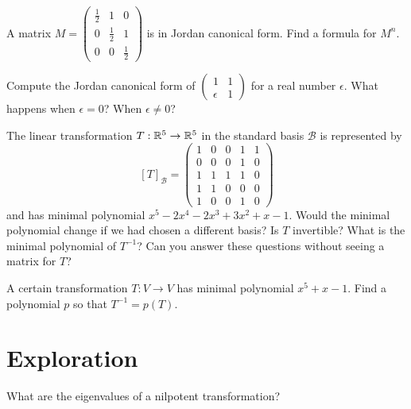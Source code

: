 \documentclass{homework}
\begin{document}
\begin{problem}
  A matrix $M = \left(\begin{array}{rrr}
\frac{1}{2} & 1 & 0 \\
0 & \frac{1}{2} & 1 \\
0 & 0 & \frac{1}{2}
\end{array}\right)$ is in Jordan canonical form.  Find a formula for $M^n$.
\end{problem}

\begin{problem}
  Compute the Jordan canonical form of
  $\begin{pmatrix} 1 & 1 \\ \epsilon & 1 \end{pmatrix}$ for a real number $\epsilon$.  What happens when $\epsilon = 0$?  When $\epsilon \neq 0$?
\end{problem}

\begin{problem}
  The linear transformation $T : \mathbb{R}^5 \to \mathbb{R}^5$ in the standard basis $\mathcal{B}$ is represented by
  \[
    [T]_{\mathcal{B}} = \left(\begin{array}{rrrrr}
            1 & 0 & 0 & 1 & 1 \\
            0 & 0 & 0 & 1 & 0 \\
            1 & 1 & 1 & 1 & 0 \\
            1 & 1 & 0 & 0 & 0 \\
            1 & 0 & 0 & 1 & 0
          \end{array}\right)
      \]
      and has minimal polynomial $x^{5} - 2x^{4} - 2x^{3} + 3x^{2} + x - 1$.  Would the minimal polynomial change if we had chosen a different basis?  Is $T$ invertible?  What is the minimal polynomial of $T^{-1}$?  Can you answer these questions without seeing a matrix for $T$?
\end{problem}

\begin{problem}
  A certain transformation $T : V \to V$ has minimal polynomial
  $x^5 + x - 1$.  Find a polynomial $p$ so that $T^{-1} = p(T)$.
\end{problem}

\section{Exploration}

\begin{problem}
  What are the eigenvalues of a nilpotent transformation?
\end{problem}
\end{document}
